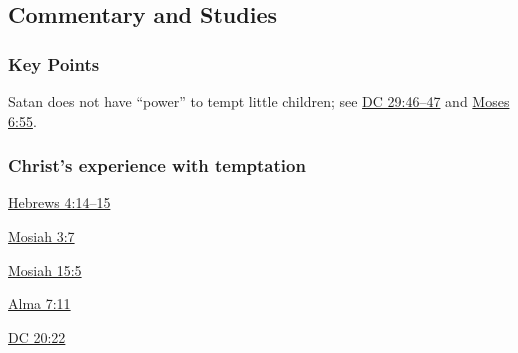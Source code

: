 	
		
	
	
	
	
\subsection{Commentary and Studies} %
	\label{TEMPTATION-COMMENTARY}

	\subsubsection{Key Points}
		\label{TEMPTATION-KEYS}
	
		\begin{compactitem}
			\item Satan does not have ``power'' to tempt little children; see \hyperref[DC29-46]{DC 29:46--47} and \hyperref[MOSES-6-55]{Moses 6:55}.
		\end{compactitem}
		
	\subsubsection{Christ's experience with temptation}
		\label{TEMPTATION-christ}
		
		\begin{compactitem}
			\item \hyperref[HEBREWS-4-14]{Hebrews 4:14--15}
			\item \hyperref[MOSIAH-3-7]{Mosiah 3:7}
			\item \hyperref[MOSIAH-15-5]{Mosiah 15:5}
			\item \hyperref[ALMA-7-11]{Alma 7:11}
			\item \hyperref[DC20-22]{DC 20:22}
		\end{compactitem}